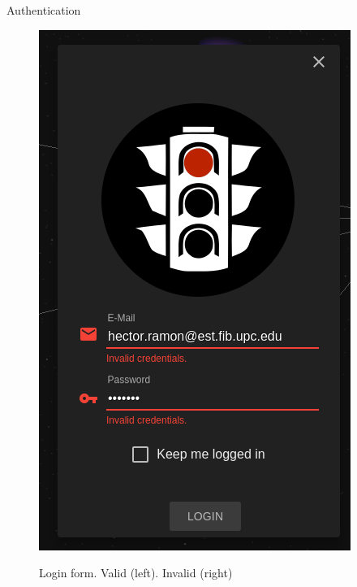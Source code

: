 \documentclass{beamer}
\begin{document}
\begin{frame}{Authentication}
\begin{figure}[H]
{{\includegraphics{images/login_error.png}
}
}
\caption{Login form. Valid (left). Invalid (right)}
\end{figure}
\end{frame}
\end{document}
